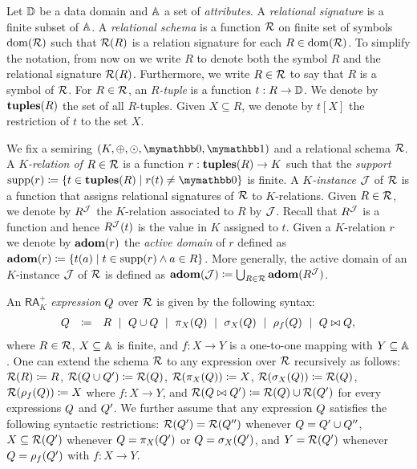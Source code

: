 Let $\mathbb{D}$ be a data domain and $\mathbb{A}$ a set of \textit{attributes}. A \textit{relational signature} is a finite subset of $\mathbb{A}$. A \textit{relational schema} is a function $\mathcal{R}$ on finite set of symbols $\operatorname{dom}(\mathcal{R})$ such that $\mathcal{R}(R)$ is a relation signature for each $R \in \operatorname{dom}(\mathcal{R})$. To simplify the notation, from now on we write $R$ to denote both the symbol $R$ and the relational signature $\mathcal{R}(R)$.
Furthermore, we write $R \in \mathcal{R}$ to say that $R$ is a symbol of $\mathcal{R}$. 
For $R \in \mathcal{R}$, an \textit{$R$-tuple} is a function $t: R \rightarrow \mathbb{D}$. We denote by $\mathbf{tuples}(R)$ the set of all $R$-tuples. Given $X \subseteq R$, we denote by $t[X]$ the restriction of $t$ to the set $X$.

We fix a semiring $(K, \ksum, \kprod, \kzero, \kone)$ and a relational schema $\mathcal{R}$. A \textit{$K$-relation of} $R \in \mathcal{R}$ is a function $r: \mathbf{tuples}(R) \rightarrow K$ such that the \textit{support}  $\supp(r)\coloneqq  \{t \in \tuples(R) \mid r(t) \neq \kzero\}$ is finite. 
A \textit{$K$-instance} $\mathcal{J}$ of $\mathcal{R}$ is a function that assigns relational signatures of $\mathcal{R}$ to $K$-relations. Given $R \in \mathcal{R}$, we denote by $R^{\mathcal{J}}$ the $K$-relation associated to $R$ by $\mathcal{J}$. Recall that $R^{\mathcal{J}}$ is a function and hence  $R^{\mathcal{J}}(t)$ is the value in $K$ assigned to $t$. 
Given a $K$-relation $r$ we denote by $\mathbf{adom}(r)$ the \textit{active domain} of $r$ defined as $\mathbf{adom}(r)\coloneqq  \{t(a) \mid t \in \operatorname{supp}(r) \wedge a \in R\}$. More generally, the active domain of an $K$-instance $\mathcal{J}$ of $\mathcal{R}$ is defined as $\mathbf{adom}(\mathcal{J})\coloneqq  \bigcup_{R \in \mathcal{R}} \mathbf{adom}(R^{\mathcal{J}})$. 

An $\mathsf{RA}_{K}^+$  \textit{expression} $Q$ over $\mathcal{R}$ is given by the following syntax:
$$
\begin{array}{rcl}
Q & \coloneqq  & R \ \mid \ Q \cup Q \ \mid \  \pi_X(Q) \ \mid \  \sigma_X(Q) \ \mid \ \rho_f(Q) \ \mid \ Q \bowtie Q,
\end{array}
$$
where $R \in \mathcal{R}$, $X \subseteq \mathbb{A}$ is finite, and $f: X \rightarrow Y$ is a one-to-one mapping with $Y \subseteq \mathbb{A}$. One can extend the schema $\mathcal{R}$ to any expression over $\mathcal{R}$ recursively as follows: $\mathcal{R}(R)\coloneqq  R$, $\mathcal{R}(Q \cup Q')\coloneqq  \mathcal{R}(Q)$, $\mathcal{R}(\pi_X(Q))\coloneqq  X$, $\mathcal{R}(\sigma_X(Q))\coloneqq  \mathcal{R}(Q)$, $\mathcal{R}(\rho_f(Q))\coloneqq  X$ where $f:X \rightarrow Y$, and $\mathcal{R}(Q \bowtie Q')\coloneqq  \mathcal{R}(Q) \cup \mathcal{R}(Q')$ for every expressions $Q$ and $Q'$.
We further assume that any expression $Q$ satisfies the following syntactic restrictions: $\mathcal{R}(Q') = \mathcal{R}(Q'')$ whenever $Q = Q' \cup Q''$, $X \subseteq \mathcal{R}(Q')$ whenever $Q = \pi_X(Q')$ or $Q = \sigma_X(Q')$, and $Y = \mathcal{R}(Q')$ whenever $Q = \rho_f(Q')$ with $f: X \rightarrow Y$.

